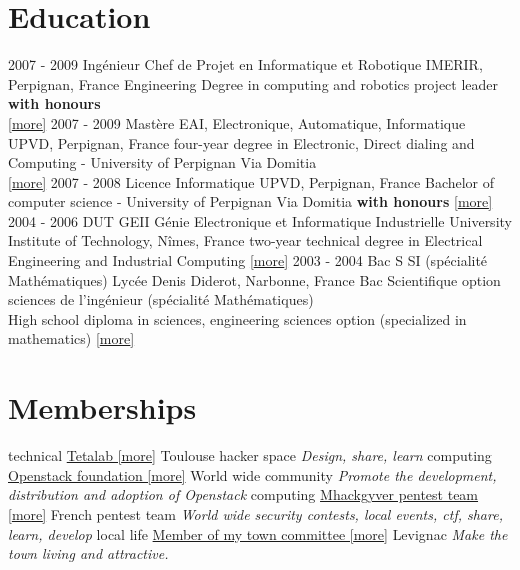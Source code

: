 \documentclass[]{friggeri-cv}
\begin{document}
\section{Education}
\begin{entrylist}
    \entry
        {2007 - 2009}
        {Ingénieur Chef de Projet en Informatique et Robotique}
        {IMERIR, Perpignan, France}
        {Engineering Degree in computing and robotics project leader 
	\textbf{with honours}\\
        \href{https://www.imerir.com/}{[\underline{more}]}
	}
    \entry
        {2007 - 2009}
        {Mastère EAI, Electronique, Automatique, Informatique}
        {UPVD, Perpignan, France}
	{four-year degree in Electronic, Direct dialing and Computing - University of Perpignan Via Domitia\\
        \href{https://www.univ-perp.fr/master-electronique-automatique-informatique-28229.kjsp}{[\underline{more}]}
	}
    \entry
        {2007 - 2008}
        {Licence Informatique}
        {UPVD, Perpignan, France}
	{Bachelor of computer science - University of Perpignan Via Domitia
	\textbf{with honours}
        \href{https://www.univ-perp.fr/licence-informatique-4727.kjsp}{[\underline{more}]}
	}
    \entry
        {2004 - 2006}
        {DUT GEII Génie Electronique et Informatique Industrielle}
        {University Institute of Technology, Nîmes, France}
	{two-year technical degree in Electrical Engineering and Industrial Computing 
        \href{http://www.iut-nimes.fr/dut/geii}{[\underline{more}]}
	}
    \entry
        {2003 - 2004}
        {Bac S SI (spécialité Mathématiques)}
        {Lycée Denis Diderot, Narbonne, France}
	{Bac Scientifique option sciences de l'ingénieur (spécialité Mathématiques) \\
	High school diploma in sciences, engineering sciences option (specialized in mathematics)
        \href{https://www.lyc-michel-narbonne.ac-montpellier.fr/content/bac-s}{[\underline{more}]}
	}
\end{entrylist}

\section{Memberships}
\begin{entrylist}
    \entry
        {technical}
        {\href{https://www.tetalab.org/en}{Tetalab [\underline{more}]}}
        {Toulouse hacker space}
        {\emph{Design, share, learn}}
    \entry
        {computing}
        {\href{https://www.openstack.org/foundation/}{Openstack foundation [\underline{more}]}}
        {World wide community}
        {\emph{Promote the development, distribution and adoption of Openstack}}
    \entry
        {computing}
        {\href{https://github.com/mhackgyver-squad/mhackgyver}{Mhackgyver pentest team [\underline{more}]}}
        {French pentest team}
        {\emph{World wide security contests, local events, ctf, share, learn, develop}}
    \entry
        {local life}
        {\href{https://www.mairie-levignac.com/}{Member of my town committee [\underline{more}]}}
        {Levignac}
        {\emph{Make the town living and attractive.}}
\end{entrylist}
\newpage
\end{document}
